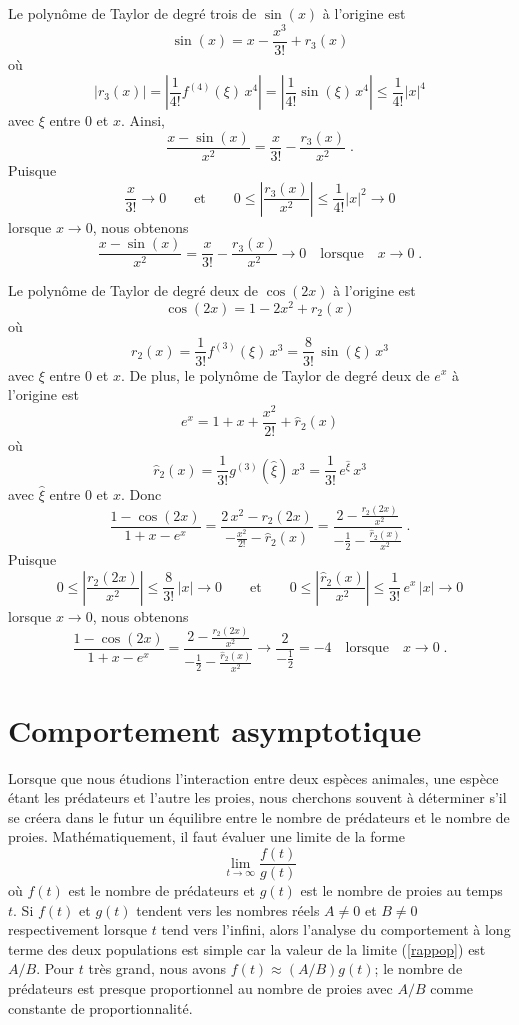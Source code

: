 {\begin{egg}
 Le polynôme de Taylor de degré trois de $\sin(x)$ à l'origine
est
\[
\sin(x) = x - \frac{x^3}{3!} + r_3(x)
\]
où
\[
\left| r_3(x) \right| = \left| \frac{1}{4!} f^{(4)}(\xi)\, x^4 \right|
= \left| \frac{1}{4!} \sin(\xi)\, x^4 \right| \leq \frac{1}{4!} |x|^4
\]
avec $\xi$ entre $0$ et $x$.  Ainsi,
\[
\frac{x-\sin(x)}{x^2} = \frac{x}{3!} - \frac{r_3(x)}{x^2} \; .
\]
Puisque
\[
\frac{x}{3!} \rightarrow 0 \qquad \text{et} \qquad
0 \leq \left| \frac{r_3(x)}{x^2} \right| \leq \frac{1}{4!} |x|^2 \rightarrow 0
\]
lorsque $x\rightarrow 0$, nous obtenons
\[
\frac{x-\sin(x)}{x^2} = \frac{x}{3!} - \frac{r_3(x)}{x^2}
\rightarrow 0 \quad \text{lorsque} \quad x\rightarrow 0 \; .
\]

 Le polynôme de Taylor de degré deux de $\cos(2x)$ à l'origine
est
\[
\cos(2x) = 1 - 2x^2 + r_2(x)
\]
où
\[
r_2(x) = \frac{1}{3!} f^{(3)}(\xi)\, x^3 = \frac{8}{3!} \, \sin(\xi)\, x^3
\]
avec $\xi$ entre $0$ et $x$.  De plus, le polynôme de Taylor de degré
deux de $e^x$ à l'origine est
\[
e^x = 1 + x + \frac{x^2}{2!} + \hat{r}_2(x)
\]
où
\[
\hat{r}_2(x) = \frac{1}{3!} g^{(3)}(\hat{\xi})\, x^3 = \frac{1}{3!} \,
e^{\hat{\xi}}\,x^3
\]
avec $\hat{\xi}$ entre $0$ et $x$.  Donc
\[
\frac{1-\cos(2x)}{1+x-e^x} = \frac{\displaystyle 2\,x^2 - r_2(2x)}
{\displaystyle -\frac{x^2}{2!} - \hat{r}_2(x)}
= \frac{\displaystyle 2 - \frac{r_2(2x)}{x^2}}
{\displaystyle -\frac{1}{2} - \frac{\hat{r}_2(x)}{x^2}} \; .
\]
Puisque
\[
0 \leq \left| \frac{r_2(2x)}{x^2} \right|
\leq \frac{8}{3!} \, |x| \rightarrow 0  \qquad \text{et} \qquad
0 \leq \left| \frac{\hat{r}_2(x)}{x^2} \right| \leq
\frac{1}{3!} \,e^x\,|x| \rightarrow 0
\]
lorsque $x\rightarrow 0$, nous obtenons
\[
\frac{1-\cos(2x)}{1+x-e^x}
= \frac{\displaystyle 2 - \frac{r_2(2x)}{x^2}}
{\displaystyle -\frac{1}{2} - \frac{\hat{r}_2(x)}{x^2}}
\rightarrow \frac{2}{\displaystyle -\frac{1}{2}} = -4 \quad
\text{lorsque} \quad x \rightarrow 0 \; .
\]
\end{egg}

\section{Comportement asymptotique \life \eng}\label{asympt_comp}

Lorsque que nous étudions l'interaction entre deux espèces animales, une
espèce étant les prédateurs et l'autre les proies, nous cherchons souvent
à déterminer s'il se créera dans le futur un équilibre entre le nombre
de prédateurs et le nombre de proies.  Mathématiquement, il faut
évaluer une limite de la forme
\begin{equation} \label{rappop}
\lim_{t\rightarrow \infty} \frac{f(t)}{g(t)}
\end{equation}
où $f(t)$ est le nombre de prédateurs et $g(t)$ est le nombre de
proies au temps $t$.  Si $f(t)$ et $g(t)$ tendent vers les nombres
réels $A\neq 0$ et $B\neq 0$ respectivement lorsque $t$ tend vers
l'infini, alors l'analyse du comportement à long terme des deux
populations est simple car la valeur de la limite (\ref{rappop}) est
$A/B$.  Pour $t$ très grand, nous avons $f(t) \approx (A/B) g(t)$; le nombre
de prédateurs est presque proportionnel au nombre de proies avec $A/B$
comme constante de proportionnalité.

}
